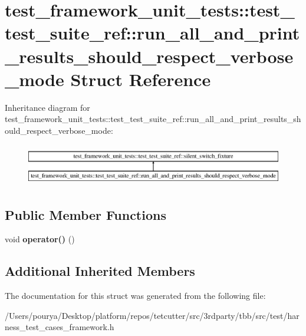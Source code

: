\hypertarget{structtest__framework__unit__tests_1_1test__test__suite__ref_1_1run__all__and__print__results__should__respect__verbose__mode}{}\section{test\+\_\+framework\+\_\+unit\+\_\+tests\+:\+:test\+\_\+test\+\_\+suite\+\_\+ref\+:\+:run\+\_\+all\+\_\+and\+\_\+print\+\_\+results\+\_\+should\+\_\+respect\+\_\+verbose\+\_\+mode Struct Reference}
\label{structtest__framework__unit__tests_1_1test__test__suite__ref_1_1run__all__and__print__results__should__respect__verbose__mode}
Inheritance diagram for test\+\_\+framework\+\_\+unit\+\_\+tests\+:\+:test\+\_\+test\+\_\+suite\+\_\+ref\+:\+:run\+\_\+all\+\_\+and\+\_\+print\+\_\+results\+\_\+should\+\_\+respect\+\_\+verbose\+\_\+mode\+:\begin{figure}[H]
\begin{center}
\leavevmode
\includegraphics[height=1.857380cm]{structtest__framework__unit__tests_1_1test__test__suite__ref_1_1run__all__and__print__results__should__respect__verbose__mode}
\end{center}
\end{figure}
\subsection*{Public Member Functions}
\begin{DoxyCompactItemize}
\item 
\hypertarget{structtest__framework__unit__tests_1_1test__test__suite__ref_1_1run__all__and__print__results__should__respect__verbose__mode_aa75a8062570dace0048e05cfd5996336}{}void {\bfseries operator()} ()\label{structtest__framework__unit__tests_1_1test__test__suite__ref_1_1run__all__and__print__results__should__respect__verbose__mode_aa75a8062570dace0048e05cfd5996336}

\end{DoxyCompactItemize}
\subsection*{Additional Inherited Members}


The documentation for this struct was generated from the following file\+:\begin{DoxyCompactItemize}
\item 
/\+Users/pourya/\+Desktop/platform/repos/tetcutter/src/3rdparty/tbb/src/test/harness\+\_\+test\+\_\+cases\+\_\+framework.\+h\end{DoxyCompactItemize}
